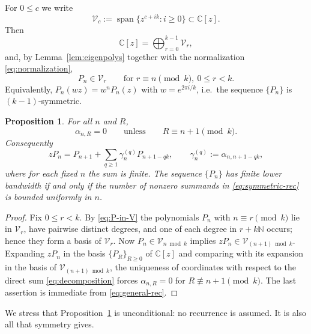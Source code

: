 \documentclass{amsart}
\newtheorem{proposition}[theorem]{Proposition}
\theoremstyle{definition}
\DeclareMathOperator{\spn}{span}
\newcommand{\N}{\mathbb N}
\newcommand{\C}{\mathbb C}
\begin{document}
For \(0\le c\) we write
\begin{equation}\label{eq:Vc}
\mathcal V_c:=\spn\{z^{c+ik}:i\ge0\}\subset\C[z].
\end{equation}
Then
\begin{equation}\label{eq:decomposition}
\C[z]=\bigoplus_{r=0}^{k-1}\mathcal V_r ,
\end{equation}
and, by Lemma~\ref{lem:eigenpolys} together with the normalization
\eqref{eq:normalization},
\begin{equation}\label{eq:P-in-V}
P_n\in\mathcal V_{r}\qquad\text{for } r\equiv n \pmod k,\ 0\le r<k .
\end{equation}
Equivalently, \(P_n(wz)=w^n P_n(z)\) with \(w=e^{2\pi i/k}\), i.e.\ the
sequence \(\{P_n\}\) is \((k-1)\)-symmetric.

\begin{proposition}\label{prop:congruence}
For all \(n\) and \(R\),
\[
\alpha_{n,R}=0
\qquad\text{unless}\qquad
R\equiv n+1 \pmod k .
\]
Consequently
\begin{equation}\label{eq:symmetric-rec}
zP_n=P_{n+1}+\sum_{q\ge1}\gamma_n^{(q)}P_{n+1-qk},
\qquad \gamma_n^{(q)}:=\alpha_{n,n+1-qk},
\end{equation}
where for each fixed \(n\) the sum is finite.  The sequence \(\{P_n\}\) has
finite lower bandwidth if and only if the number of nonzero summands in
\eqref{eq:symmetric-rec} is bounded uniformly in \(n\).
\end{proposition}

\begin{proof}
Fix \(0\le r<k\).  By \eqref{eq:P-in-V} the polynomials \(P_n\) with
\(n\equiv r \pmod k\) lie in \(\mathcal V_r\), have pairwise distinct
degrees, and one of each degree in \(r+k\N\) occurs; hence they form a basis
of \(\mathcal V_r\).  Now \(P_n\in\mathcal V_{n\bmod k}\) implies
\(zP_n\in\mathcal V_{(n+1)\bmod k}\).  Expanding \(zP_n\) in the basis
\(\{P_R\}_{R\ge0}\) of \(\C[z]\) and comparing with its expansion in the
basis of \(\mathcal V_{(n+1)\bmod k}\), the uniqueness of coordinates with
respect to the direct sum \eqref{eq:decomposition} forces
\(\alpha_{n,R}=0\) for \(R\not\equiv n+1 \pmod k\).  The last assertion is
immediate from \eqref{eq:general-rec}.
\end{proof}

We stress that Proposition~\ref{prop:congruence} is unconditional: no
recurrence is assumed.  It is also all that symmetry gives.
\end{document}

